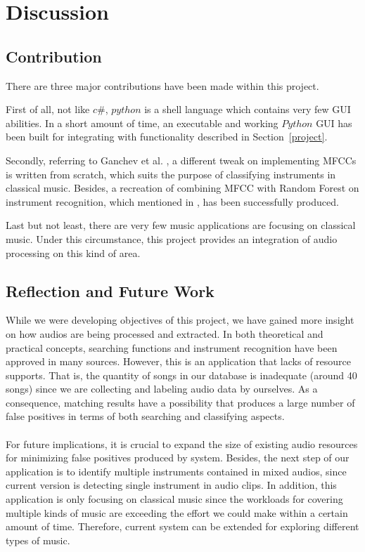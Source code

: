\documentclass[whitelogo,12pt]{tudelft-report}
\begin{document}
\chapter{Discussion}
\section{Contribution}
There are three major contributions have been made within this project. 

First of all, not like $c\#$, $python$ is a shell language which contains very few GUI abilities. In a short amount of time, an executable and working $Python$ GUI has been built for integrating with functionality described in Section~\ref{project}. 

Secondly, referring to Ganchev et al. \cite{ganchev2005}, a different tweak on implementing MFCCs is written from scratch, which suits the purpose of classifying instruments in classical music. Besides, a recreation of combining MFCC with Random Forest on instrument recognition, which mentioned in \cite{li2015}, has been successfully produced.

Last but not least, there are very few music applications are focusing on  classical music. Under this circumstance, this project provides an integration of audio processing  on this kind of area.

\section{Reflection and Future Work}
While we were developing objectives of this project, we have gained more insight on how audios are being processed and extracted. In both theoretical and practical concepts, searching functions and instrument recognition have been approved in many sources. However, this is an application that lacks of resource supports. That is, the quantity of songs in our database is inadequate (around 40 songs) since we are collecting and labeling audio data by ourselves. As a consequence, matching results have a possibility that produces a large number of false positives in terms of both searching and classifying aspects. \\
\\
For future implications, it is crucial to expand the size of existing audio resources for minimizing false positives produced by system. Besides, the next step of our application is to identify multiple instruments contained in  mixed audios, since current version is detecting single instrument in audio clips.  In addition, this application is only focusing on classical music since the workloads for covering multiple kinds of music are exceeding the effort we could make within a certain amount of time. Therefore, current system can be extended for exploring different types of music.
\end{document}
